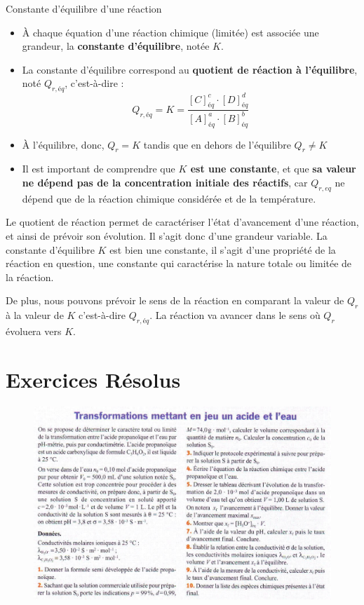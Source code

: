 \documentclass[11pt,a4paper]{article}
\begin{document}
\begin{defn}{Constante d'équilibre d'une réaction}
\begin{itemize}
    \item À chaque équation d’une réaction chimique (limitée) est associée une grandeur, la \textbf{constante d’équilibre}, notée $K$.  
    \item La constante d'équilibre correspond au \textbf{quotient de réaction à l'équilibre}, noté $Q_{r,éq}$, c'est-à-dire : 
        \[
    Q_{r,éq} = K = \dfrac{\left[C\right]^c_{éq}\cdot\left[D\right]^d_{éq}}{\left[A\right]^a_{éq}\cdot\left[B\right]^b_{éq}}
    \]
    \item À l'équilibre, donc, $Q_r = K$ tandis que en dehors de l’équilibre $Q_r \neq K$
    \item Il est important de comprendre que \textbf{$K$ est une constante}, et que \textbf{sa valeur ne dépend pas de la concentration initiale des réactifs}, car $Q_{r,eq}$  ne dépend que de la réaction chimique considérée et de la température. 
\end{itemize}
\end{defn}

\begin{rmrq}
Le quotient de réaction permet de caractériser l'état d'avancement d'une réaction, et ainsi de prévoir son évolution. Il s'agit donc d'une grandeur variable. La constante d'équilibre $K$ est bien une constante, il s'agit d'une propriété de la réaction en question, une constante qui caractérise la nature totale ou limitée de la réaction. 

De plus, nous pouvons prévoir le sens de la réaction en comparant la valeur de $Q_r$ à la valeur de $K$ c'est-à-dire $Q_{r,éq}$.  La réaction va avancer dans le sens où $Q_r$  évoluera vers $K$. 
\end{rmrq}

\centering
\section{Exercices Résolus}
\begin{figure}[h]
    \centering
    \includegraphics[width=\linewidth]{imgs/c2/xo1.jpg}
\end{figure}
\end{document}
